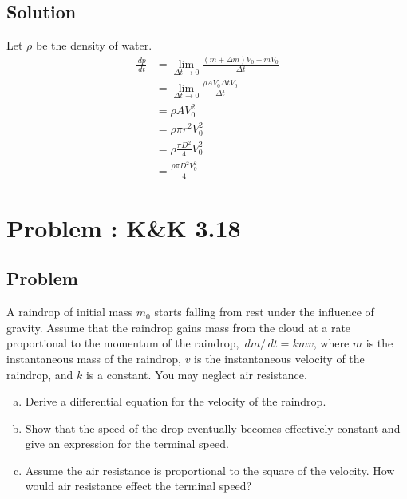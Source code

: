 \documentclass[solutions]{esg8012pset}
\renewcommand{\d}{\,d}
\begin{document}
\subsection{Solution}
  Let $\rho$ be the density of water.
  \begin{align*}
   \frac{\d p}{\d t} & = \lim_{\Delta t \longrightarrow 0} \frac{(m + \Delta m)V_0 - m V_0}{\Delta t} \\
    & = \lim_{\Delta t \longrightarrow 0} \frac{\rho A V_0 \Delta t V_0}{\Delta t} \\
    & = \rho A V_0^2 \\
    & = \rho \pi r^2 V_0^2 \\
    & = \rho \frac{\pi D^2}{4} V_0^2 \\
    & = \frac{\rho \pi D^2 V_0^2}{4}
  \end{align*}
\section{Problem \thesection: K\&K 3.18}
\subsection{Problem}
  A raindrop of initial mass $m_0$ starts falling from rest under the influence of gravity. Assume that the raindrop gains mass from the cloud at a rate proportional to the momentum of the raindrop, $\d m / \d t = k m v$, where $m$ is the instantaneous mass of the raindrop, $v$ is the instantaneous velocity of the raindrop, and $k$ is a constant. You may neglect air resistance.
  \begin{enumerate}[(a)]
    \item Derive a differential equation for the velocity of the raindrop.
    \item Show that the speed of the drop eventually becomes effectively constant and give an expression for the terminal speed.
    \item Assume the air resistance is proportional to the square of the velocity. How would air resistance effect the terminal speed?
  \end{enumerate}
\end{document}
